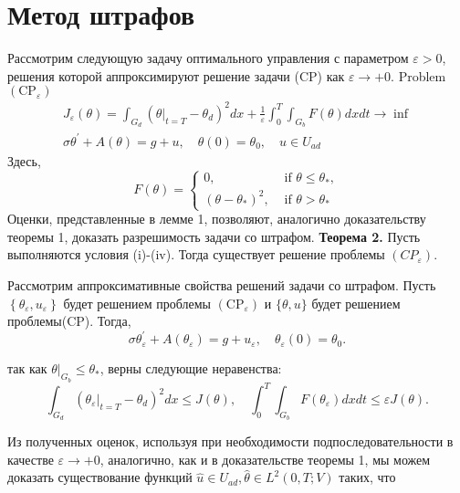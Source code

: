 \documentclass[10pt]{article}
\begin{document}
    \section{Метод штрафов}
    Рассмотрим следующую задачу оптимального управления с параметром $\varepsilon>0$,
    решения которой аппроксимируют решение задачи (CP) как $\varepsilon \rightarrow+0$.
    Problem $\left(\mathrm{CP}_{\varepsilon}\right)$
    \[
        \begin{gathered}
            J_{\varepsilon}(\theta)=\int_{G_{d}}\left(\left.\theta\right|_{t=T}-\theta_{d}\right)^{2} d x+\frac{1}{\varepsilon} \int_{0}^{T} \int_{G_{b}} F(\theta) d x d t \rightarrow \inf \\
            \sigma \theta^{\prime}+A(\theta)=g+u, \quad \theta(0)=\theta_{0}, \quad u \in U_{a d}
        \end{gathered}
    \]
    Здесь,
    \[
        F(\theta)=
        \begin{cases}
            0, & \text { if } \theta \leq \theta_{*}, \\
            \left(\theta-\theta_{*}\right)^{2}, & \text { if } \theta>\theta_{*}
        \end{cases}
    \]
    Оценки, представленные в лемме 1, позволяют, аналогично доказательству теоремы 1, доказать разрешимость задачи со штрафом.
    \textbf{Теорема 2.} Пусть выполняются условия (i)-(iv).
    Тогда существует решение проблемы $\left(C P_{\varepsilon}\right)$.

    Рассмотрим аппроксимативные свойства решений задачи со штрафом.
    Пусть $\left\{\theta_{\varepsilon}, u_{\varepsilon}\right\}$ будет решением проблемы
    $\left(\mathrm{CP}_{\varepsilon}\right)$ и $\{\theta, u\}$ будет решением проблемы(CP).
    Тогда,
    \[
        \sigma \theta_{\varepsilon}^{\prime}+A\left(\theta_{\varepsilon}\right)=g+u_{\varepsilon},
        \quad \theta_{\varepsilon}(0)=\theta_{0}.
    \]

    так как $\left.\theta\right|_{G_{b}} \leq \theta_{*}$, верны следующие неравенства:
    \[
        \int_{G_{d}}\left(\left.\theta_{\varepsilon}\right|_{t=T}-\theta_{d}\right)^{2} d x \leq J(\theta),
        \quad \int_{0}^{T} \int_{G_{b}} F\left(\theta_{\varepsilon}\right) d x d t \leq \varepsilon J(\theta).
    \]

    Из полученных оценок, используя при необходимости подпоследовательности в качестве
    $\varepsilon \rightarrow+0$, аналогично, как и в доказательстве теоремы 1, мы можем доказать существование функций
    $\widehat{u} \in U_{a d}, \widehat{\theta} \in L^{2}(0, T ; V)$ таких, что
\end{document}
